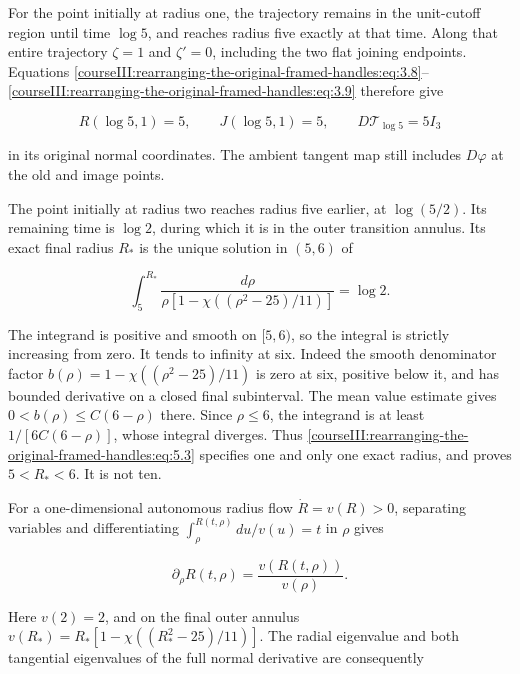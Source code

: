 For the point initially at radius one, the trajectory remains in the unit-cutoff region until time \(\log5\), and reaches radius five exactly at that time. Along that entire trajectory \(\zeta=1\) and \(\zeta'=0\), including the two flat joining endpoints. Equations \eqref{courseIII:rearranging-the-original-framed-handles:eq:3.8}--\eqref{courseIII:rearranging-the-original-framed-handles:eq:3.9} therefore give

\begin{equation}
R(\log5,1)=5,\qquad J(\log5,1)=5,\qquad
D\mathcal T_{\log5}=5I_3
\label{courseIII:rearranging-the-original-framed-handles:eq:5.2}
\end{equation}

in its original normal coordinates. The ambient tangent map still includes \(D\varphi\) at the old and image points.

The point initially at radius two reaches radius five earlier, at \(\log(5/2)\). Its remaining time is \(\log2\), during which it is in the outer transition annulus. Its exact final radius \(R_*\) is the unique solution in \((5,6)\) of

\begin{equation}
\int_5^{R_*}
\frac{d\rho}
{\rho\left[1-\chi((\rho^2-25)/11)\right]}
=\log2.
\label{courseIII:rearranging-the-original-framed-handles:eq:5.3}
\end{equation}

The integrand is positive and smooth on \([5,6)\), so the integral is strictly increasing from zero. It tends to infinity at six. Indeed the smooth denominator factor
\(b(\rho)=1-\chi((\rho^2-25)/11)\) is zero at six, positive below it, and has bounded derivative on a closed final subinterval. The mean value estimate gives \(0<b(\rho)\leq C(6-\rho)\) there. Since \(\rho\leq6\), the integrand is at least \(1/[6C(6-\rho)]\), whose integral diverges. Thus \eqref{courseIII:rearranging-the-original-framed-handles:eq:5.3} specifies one and only one exact radius, and proves \(5<R_*<6\). It is not ten.

For a one-dimensional autonomous radius flow \(\dot R=v(R)>0\), separating variables and differentiating
\(\int_\rho^{R(t,\rho)} du/v(u)=t\) in \(\rho\) gives

\begin{equation}
\partial_\rho R(t,\rho)=\frac{v(R(t,\rho))}{v(\rho)}.
\label{courseIII:rearranging-the-original-framed-handles:eq:5.4}
\end{equation}

Here \(v(2)=2\), and on the final outer annulus
\(v(R_*)=R_*[1-\chi((R_*^2-25)/11)]\). The radial eigenvalue and both tangential eigenvalues of the full normal derivative are consequently

